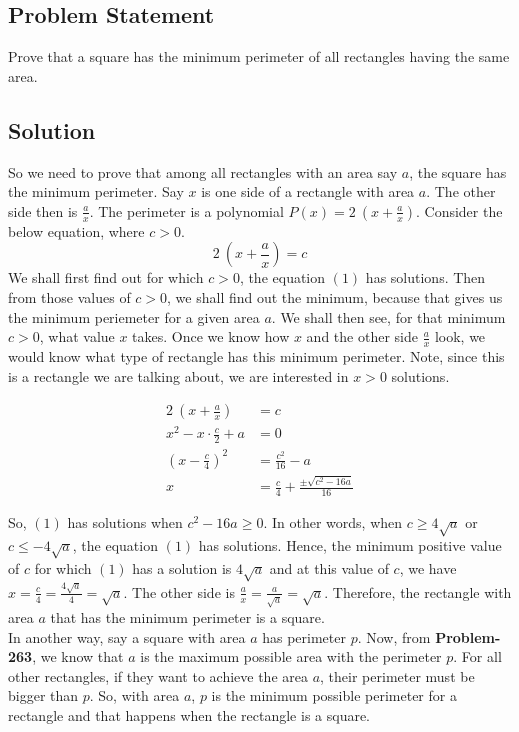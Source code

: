 \documentclass[12pt]{article}
\begin{document}
\subsection*{Problem Statement}
Prove that a square has the minimum perimeter of all rectangles having the same area.

\subsection*{Solution}
So we need to prove that among all rectangles with an area say $a$, the square has the minimum perimeter. Say $x$ is one side of a rectangle with area $a$. The other side then is $\frac{a}{x}$. The perimeter is a polynomial $P(x) = 2\ \left( x + \frac{a}{x} \right)$. Consider the below equation, where $c > 0$.
\setcounter{equation}{0}
\begin{equation}
	2\ \left( x + \frac{a}{x} \right) = c
\end{equation}
We shall first find out for which $c > 0$, the equation $(1)$ has solutions. Then from those values of $c > 0$, we shall find out the minimum, because that gives us the minimum periemeter for a given area $a$. We shall then see, for that minimum $c > 0$, what value $x$ takes. Once we know how $x$ and the other side $\frac{a}{x}$ look, we would know what type of rectangle has this minimum perimeter. Note, since this is a rectangle we are talking about, we are interested in $x > 0$ solutions.

\begin{equation*}
	\begin{aligned}
		2\ \left( x + \frac{a}{x} \right) &= c\\
		x^2 - x\cdot \frac{c}{2} + a &= 0\\
		\left( x - \frac{c}{4} \right)^2 &= \frac{c^2}{16} - a\\
		x &= \frac{c}{4} + \frac{ \pm \sqrt{ c^2 - 16a } }{16}
	\end{aligned}
\end{equation*}

So, $(1)$ has solutions when $c^2-16a \geq 0$. In other words, when $c \geq 4\sqrt{a}$ or $c \leq -4\sqrt{a}$, the equation $(1)$ has solutions. Hence, the minimum positive value of $c$ for which $(1)$ has a solution is $4\sqrt{a}$ and at this value of $c$, we have $x = \frac{c}{4} = \frac{4\sqrt{a}}{4} = \sqrt{a}$. The other side is $\frac{a}{x} = \frac{a}{\sqrt{a}} = \sqrt{a}$. Therefore, the rectangle with area $a$ that has the minimum perimeter is a square.\\

In another way, say a square with area $a$ has perimeter $p$. Now, from \textbf{Problem-263}, we know that $a$ is the maximum possible area with the perimeter $p$. For all other rectangles, if they want to achieve the area $a$, their perimeter must be bigger than $p$. So, with area $a$, $p$ is the minimum possible perimeter for a rectangle and that happens when the rectangle is a square.
\end{document}
